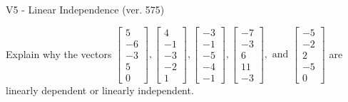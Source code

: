 \begin{exercise}
  \begin{exerciseTitle}V5 - Linear Independence (ver. 575)\end{exerciseTitle}
  \begin{exerciseStatement}
    Explain why the vectors \(\left[\begin{array}{r}
5 \\
-6 \\
-3 \\
5 \\
0
\end{array}\right] , \left[\begin{array}{r}
4 \\
-1 \\
-3 \\
-2 \\
1
\end{array}\right] , \left[\begin{array}{r}
-3 \\
-1 \\
-5 \\
-4 \\
-1
\end{array}\right] , \left[\begin{array}{r}
-7 \\
-3 \\
6 \\
11 \\
-3
\end{array}\right] , \text{ and } \left[\begin{array}{r}
-5 \\
-2 \\
2 \\
-5 \\
0
\end{array}\right]\) are linearly dependent or linearly independent.	



\end{exerciseStatement}
\end{exercise}

